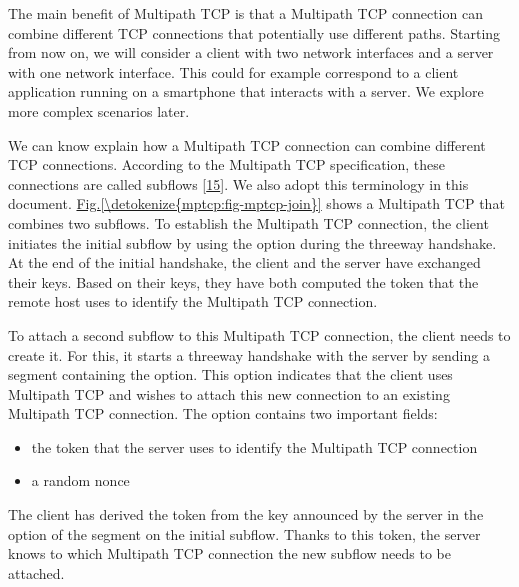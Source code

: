 \documentclass[letterpaper,10pt,english]{sphinxmanual}
\begin{document}
\sphinxAtStartPar
The main benefit of Multipath TCP is that a Multipath TCP connection can combine different TCP connections that potentially use different paths. Starting from now on, we will consider a client with two network interfaces and a server with one network interface. This could for example correspond to a client application running on a smartphone that interacts with a server. We explore more complex scenarios later.

\sphinxAtStartPar
We can know explain how a Multipath TCP connection can combine different TCP connections. According to the Multipath TCP specification, these connections are called subflows {[}\hyperlink{cite.biblio:id8500}{15}{]}. We also adopt this terminology in this document. \hyperref[\detokenize{mptcp:fig-mptcp-join}]{Fig.\@ \ref{\detokenize{mptcp:fig-mptcp-join}}} shows a Multipath TCP that combines two subflows. To establish the Multipath TCP connection, the client initiates the initial subflow by using the  option during the three\sphinxhyphen{}way handshake. At the end of the initial handshake, the client and the server have exchanged their keys. Based on their keys, they have both computed the token that the remote host uses to identify the Multipath TCP connection.

\sphinxAtStartPar
To attach a second subflow to this Multipath TCP connection, the client needs to create it. For this, it starts a three\sphinxhyphen{}way handshake with the server by sending a  segment containing the  option. This option indicates that the client uses Multipath TCP and wishes to attach this new connection to an existing Multipath TCP connection. The  option contains two important fields:
\begin{itemize}
\item {} 
\sphinxAtStartPar
the token that the server uses to identify the Multipath TCP connection

\item {} 
\sphinxAtStartPar
a random nonce

\end{itemize}

\sphinxAtStartPar
The client has derived the token from the key announced by the server in the  option of the  segment on the initial subflow. Thanks to this token, the server knows to which Multipath TCP connection the new subflow needs to be attached.
\end{document}
